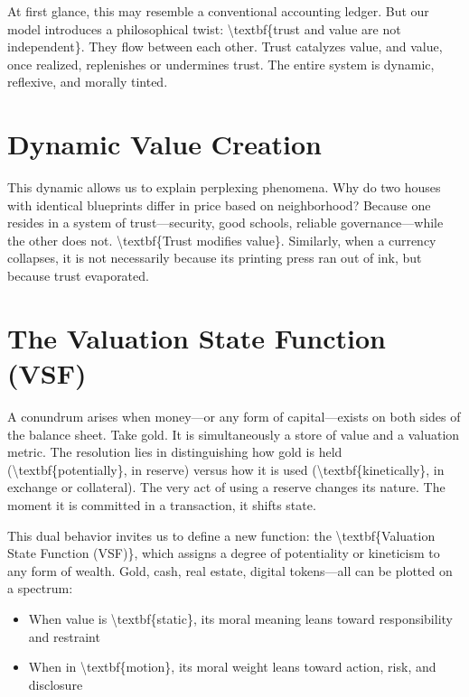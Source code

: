 \documentclass[11pt,oneside]{book}
\begin{document}
At first glance, this may resemble a conventional accounting ledger. But our model introduces a philosophical twist: \textbackslash textbf\{trust and value are not independent\}. They flow between each other. Trust catalyzes value, and value, once realized, replenishes or undermines trust. The entire system is dynamic, reflexive, and morally tinted.

\section{Dynamic Value Creation}

This dynamic allows us to explain perplexing phenomena. Why do two houses with identical blueprints differ in price based on neighborhood? Because one resides in a system of trust—security, good schools, reliable governance—while the other does not. \textbackslash textbf\{Trust modifies value\}. Similarly, when a currency collapses, it is not necessarily because its printing press ran out of ink, but because trust evaporated.

\section{The Valuation State Function (VSF)}

A conundrum arises when money—or any form of capital—exists on both sides of the balance sheet. Take gold. It is simultaneously a store of value and a valuation metric. The resolution lies in distinguishing how gold is held (\textbackslash textbf\{potentially\}, in reserve) versus how it is used (\textbackslash textbf\{kinetically\}, in exchange or collateral). The very act of using a reserve changes its nature. The moment it is committed in a transaction, it shifts state.

This dual behavior invites us to define a new function: the \textbackslash textbf\{Valuation State Function (VSF)\}, which assigns a degree of potentiality or kineticism to any form of wealth. Gold, cash, real estate, digital tokens—all can be plotted on a spectrum:

\begin{itemize}
\item When value is \textbackslash textbf\{static\}, its moral meaning leans toward responsibility and restraint
\item When in \textbackslash textbf\{motion\}, its moral weight leans toward action, risk, and disclosure
\end{itemize}
\end{document}
